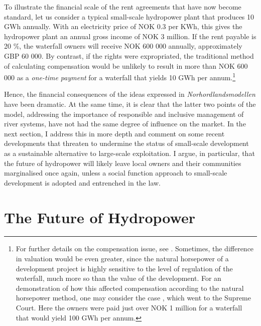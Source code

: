 To illustrate the financial scale of the rent agreements that have now become standard, let us consider a typical small-scale hydropower plant that produces 10 GWh annually. With an electricity price of NOK 0.3 per KWh, this gives the hydropower plant an annual gross income of NOK 3 million. If the rent payable is 20 \%, the waterfall owners will receive NOK 600 000 annually, approximately GBP 60 000. By contrast, if the rights were expropriated, the traditional method of calculating compensation would be unlikely to result in more than NOK 600 000 as a {\it one-time payment} for a waterfall that yields 10 GWh per annum.\footnote{For further details on the compensation issue, see \cite{dyrkolbotn14,dyrkolbotn15,dyrkolbotn15a}. Sometimes, the difference in valuation would be even greater, since the natural horsepower of a development project is highly sensitive to the level of regulation of the waterfall, much more so than the value of the development. For an demonstration of how this affected compensation according to the natural horsepower method, one may consider the case \cite{hellandsfoss97}, which went to the Supreme Court. Here the owners were paid just over NOK 1 million for a waterfall that would yield 100 GWh per annum.}

Hence, the financial consequences of the ideas expressed in {\it Norhordlandsmodellen} have been dramatic. At the same time, it is clear that the latter two points of the model, addressing the importance of responsible and inclusive management of river systems, have not had the same degree of influence on the market. In the next section, I address this in more depth and comment on some recent developments that threaten to undermine the status of small-scale development as a sustainable alternative to large-scale exploitation. I argue, in particular, that the future of hydropower will likely leave local owners and their communities marginalised once again, unless a social function approach to small-scale development is adopted and entrenched in the law.

\section{The Future of Hydropower}\label{sec:future}

